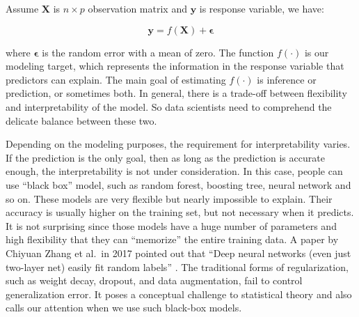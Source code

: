 \documentclass[
  12pt,
]{krantz}
\begin{document}
Assume \(\mathbf{X}\) is \(n \times p\) observation matrix and \(\mathbf{y}\) is response variable, we have:

\begin{equation}
\mathbf{y}=f(\mathbf{X})+\symbf{\epsilon}
\label{eq:generalmodeleq}
\end{equation}

where \(\symbf{\epsilon}\) is the random error with a mean of zero. The function \(f(\cdot)\) is our modeling target, which represents the information in the response variable that predictors can explain. The main goal of estimating \(f(\cdot)\) is inference or prediction, or sometimes both. In general, there is a trade-off between flexibility and interpretability of the model. So data scientists need to comprehend the delicate balance between these two.

Depending on the modeling purposes, the requirement for interpretability varies. If the prediction is the only goal, then as long as the prediction is accurate enough, the interpretability is not under consideration. In this case, people can use ``black box'' model, such as random forest, boosting tree, neural network and so on. These models are very flexible but nearly impossible to explain. Their accuracy is usually higher on the training set, but not necessary when it predicts. It is not surprising since those models have a huge number of parameters and high flexibility that they can ``memorize'' the entire training data. A paper by Chiyuan Zhang et al.~in 2017 pointed out that ``Deep neural networks (even just two-layer net) easily fit random labels'' \citep{rethinkDL}. The traditional forms of regularization, such as weight decay, dropout, and data augmentation, fail to control generalization error. It poses a conceptual challenge to statistical theory and also calls our attention when we use such black-box models.
\end{document}
